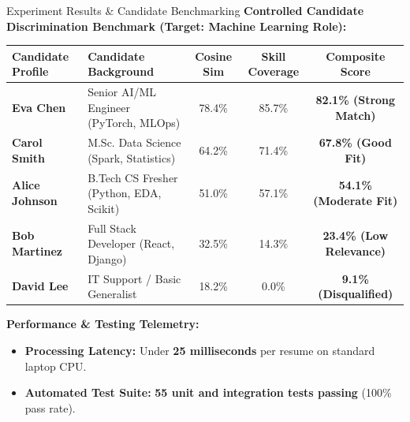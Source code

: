 \documentclass[aspectratio=169, 10pt]{beamer}
\begin{document}
\begin{frame}{Experiment Results \& Candidate Benchmarking}
  \small
  \textbf{Controlled Candidate Discrimination Benchmark (Target: Machine Learning Role):}
  \begin{table}[h]
    \centering
    \begin{tabular}{l l c c c}
      \toprule
      \textbf{Candidate Profile} & \textbf{Candidate Background} & \textbf{Cosine Sim} & \textbf{Skill Coverage} & \textbf{Composite Score} \\
      \midrule
      \textbf{Eva Chen} & Senior AI/ML Engineer (PyTorch, MLOps) & 78.4\% & 85.7\% & \textbf{82.1\% (Strong Match)} \\
      \textbf{Carol Smith} & M.Sc. Data Science (Spark, Statistics) & 64.2\% & 71.4\% & \textbf{67.8\% (Good Fit)} \\
      \textbf{Alice Johnson} & B.Tech CS Fresher (Python, EDA, Scikit) & 51.0\% & 57.1\% & \textbf{54.1\% (Moderate Fit)} \\
      \textbf{Bob Martinez} & Full Stack Developer (React, Django) & 32.5\% & 14.3\% & \textbf{23.4\% (Low Relevance)} \\
      \textbf{David Lee} & IT Support / Basic Generalist & 18.2\% & 0.0\% & \textbf{9.1\% (Disqualified)} \\
      \bottomrule
    \end{tabular}
  \end{table}

  \textbf{Performance \& Testing Telemetry:}
  \begin{itemize}
    \item \textbf{Processing Latency:} Under \textbf{25 milliseconds} per resume on standard laptop CPU.
    \item \textbf{Automated Test Suite:} \textbf{55 unit and integration tests passing} (100\% pass rate).
  \end{itemize}
\end{frame}
\end{document}
